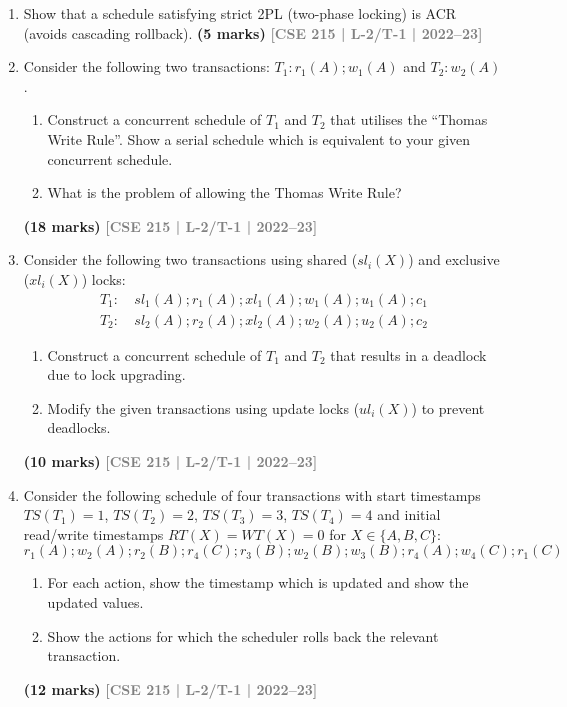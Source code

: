 \documentclass[12pt,a3paper]{article}
\newcommand{\yr}[1]{\hfill\textcolor{gray}{\small\textbf{[#1]}}}
\newcommand{\mk}[1]{\textcolor{orange!70!black}{\small\textbf{(#1 marks)}}}
\begin{document}
\begin{enumerate}
\item Show that a schedule satisfying strict 2PL (two-phase locking) is ACR (avoids cascading rollback).
\mk{5} \yr{CSE 215 | L-2/T-1 | 2022--23}

\item Consider the following two transactions: $T_1\colon r_1(A); w_1(A)$ and $T_2\colon w_2(A)$.
\begin{enumerate}
  \item Construct a concurrent schedule of $T_1$ and $T_2$ that utilises the ``Thomas Write Rule''. Show a serial schedule which is equivalent to your given concurrent schedule.
  \item What is the problem of allowing the Thomas Write Rule?
\end{enumerate}
  \mk{18} \yr{CSE 215 | L-2/T-1 | 2022--23}

\item Consider the following two transactions using shared ($sl_i(X)$) and exclusive ($xl_i(X)$) locks:
\begin{align*}
T_1\colon &\ sl_1(A); r_1(A); xl_1(A); w_1(A); u_1(A); c_1\\
T_2\colon &\ sl_2(A); r_2(A); xl_2(A); w_2(A); u_2(A); c_2
\end{align*}
\begin{enumerate}
  \item Construct a concurrent schedule of $T_1$ and $T_2$ that results in a deadlock due to lock upgrading.
  \item Modify the given transactions using update locks ($ul_i(X)$) to prevent deadlocks.
\end{enumerate}
  \mk{10} \yr{CSE 215 | L-2/T-1 | 2022--23}

\item Consider the following schedule of four transactions with start timestamps $TS(T_1)=1$, $TS(T_2)=2$, $TS(T_3)=3$, $TS(T_4)=4$ and initial read/write timestamps $RT(X)=WT(X)=0$ for $X \in \{A,B,C\}$:
\[r_1(A); w_2(A); r_2(B); r_4(C); r_3(B); w_2(B); w_3(B); r_4(A); w_4(C); r_1(C)\]
\begin{enumerate}
  \item For each action, show the timestamp which is updated and show the updated values.
  \item Show the actions for which the scheduler rolls back the relevant transaction.
\end{enumerate}
  \mk{12} \yr{CSE 215 | L-2/T-1 | 2022--23}


\end{enumerate}
\end{document}
